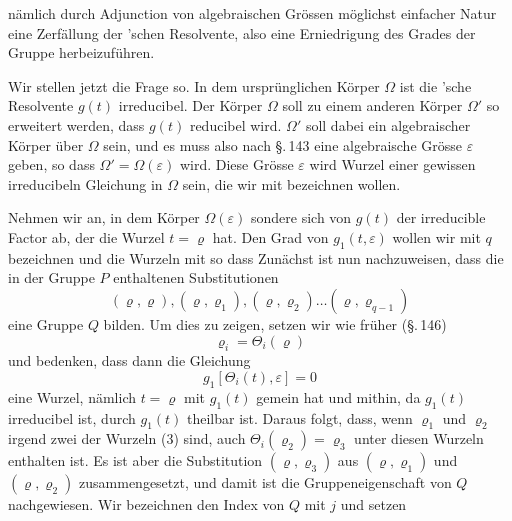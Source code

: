 n\"amlich durch Adjunction von algebraischen Gr\"ossen m\"oglichst
einfacher Natur eine Zerf\"allung der 'schen Resolvente,
also eine Erniedrigung des Grades der Gruppe herbeizuf\"uhren.

Wir stellen jetzt die Frage so. In dem urspr\"unglichen
K\"orper $\Omega$ ist die 'sche Resolvente $g(t)$ irreducibel. Der
K\"orper $\Omega$ soll zu einem anderen K\"orper $\Omega'$ so erweitert werden,
dass $g(t)$ reducibel wird. $\Omega'$ soll dabei ein algebraischer K\"orper
\"uber $\Omega$ sein, und es muss also nach \S.\,143 eine algebraische
Gr\"osse $\varepsilon$ geben, so dass $\Omega' = \Omega(\varepsilon)$ wird. Diese Gr\"osse $\varepsilon$ wird
Wurzel einer gewissen irreducibeln Gleichung in $\Omega$ sein, die
wir mit
bezeichnen wollen.

Nehmen wir an, in dem K\"orper $\Omega(\varepsilon)$ sondere sich von $g(t)$
der irreducible Factor
ab, der die Wurzel $t = \varrho$ hat. Den Grad von $g_1(t, \varepsilon)$ wollen wir
mit $q$ bezeichnen und die Wurzeln mit
so dass
Zun\"achst ist nun nachzuweisen, dass die in der Gruppe $P$
enthaltenen Substitutionen
\[ (\varrho, \varrho), (\varrho, \varrho_1), (\varrho, \varrho_2) \ldots (\varrho, \varrho_{q-1}) \]
eine Gruppe $Q$ bilden. Um dies zu zeigen, setzen wir wie
fr\"uher (\S.\,146)
\[ \varrho_i = \Theta_i(\varrho) \]
und bedenken, dass dann die Gleichung
\[ g_1[\Theta_i(t), \varepsilon] = 0 \]
eine Wurzel, n\"amlich $t = \varrho$ mit $g_1(t)$ gemein hat und mithin,
da $g_1(t)$ irreducibel ist, durch $g_1(t)$ theilbar ist. Daraus folgt,
dass, wenn $\varrho_1$ und $\varrho_2$ irgend zwei der Wurzeln (3) sind, auch
$\Theta_i(\varrho_2) = \varrho_3$ unter diesen Wurzeln enthalten ist. Es ist aber die
Substitution $(\varrho, \varrho_3)$ aus $(\varrho, \varrho_1)$ und $(\varrho, \varrho_2)$ zusammengesetzt, und
damit ist die Gruppeneigenschaft von $Q$ nachgewiesen. Wir bezeichnen den Index von $Q$ mit $j$ und setzen

